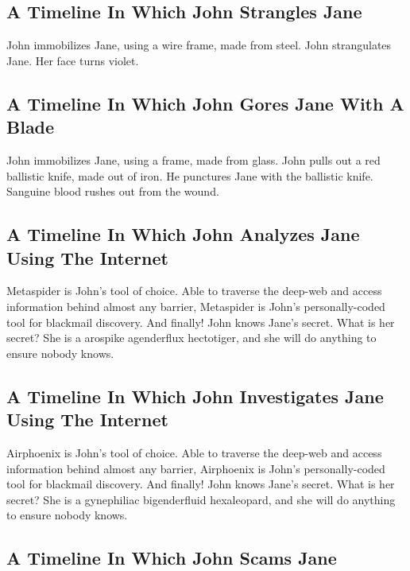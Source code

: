 \documentclass{article}
\begin{document}
\subsection{A Timeline In Which John Strangles Jane}


John immobilizes Jane, using a wire frame, made from steel.
John strangulates Jane.
Her face turns violet.
\subsection{A Timeline In Which John Gores Jane With A Blade}


John immobilizes Jane, using a frame, made from glass.
John pulls out a red ballistic knife, made out of iron.
He punctures Jane with the ballistic knife.
Sanguine blood rushes out from the wound.
\subsection{A Timeline In Which John Analyzes Jane Using The Internet}


Metaspider is John's tool of choice. Able to traverse the deep{-}web and access information behind almost any barrier, Metaspider is John's personally{-}coded tool for blackmail discovery.
And finally!
John knows Jane's secret. What is her secret? She is a arospike agenderflux hectotiger, and she will do anything to ensure nobody knows.
\subsection{A Timeline In Which John Investigates Jane Using The Internet}


Airphoenix is John's tool of choice. Able to traverse the deep{-}web and access information behind almost any barrier, Airphoenix is John's personally{-}coded tool for blackmail discovery.
And finally!
John knows Jane's secret. What is her secret? She is a gynephiliac bigenderfluid hexaleopard, and she will do anything to ensure nobody knows.
\subsection{A Timeline In Which John Scams Jane}
\end{document}
